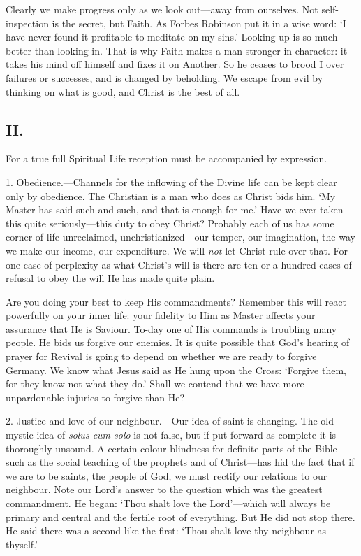 \documentclass[12pt,a5paper]{article}
\begin{document}
Clearly we make progress only as we look out---away from ourselves. Not self-inspection is the secret, but Faith. As Forbes Robinson put it in a wise word: `I have never found it profitable to meditate on my sins.' Looking up is so much better than looking in. That is why Faith makes a man stronger in character: it takes his mind off himself and fixes it on Another. So he ceases to brood I over failures or successes, and is changed by beholding. We escape from evil by thinking on what is good, and Christ is the best of all.

\subsection*{II.}

For a true full Spiritual Life reception must be accompanied by expression. 

1. Obedience.---Channels for the inflowing of the Divine life can be kept clear only by obedience. The Christian is a man who does as Christ bids him. `My Master has said such and such, and that is enough for me.' Have we ever taken this quite seriously---this duty to obey Christ? Probably each of us has some corner of life unreclaimed, unchristianized---our temper, our imagination, the way we make our income, our expenditure. We will \textit{not} let Christ rule over that. For one case of perplexity as what Christ's will is there are ten or a hundred cases of refusal to obey the will He has made quite plain.

Are you doing your best to keep His commandments? Remember this will react powerfully on your inner life: your fidelity to Him as Master affects your assurance that He is Saviour. To-day one of His commands is troubling many people. He bids us forgive our enemies. It is quite possible that God's hearing of prayer for Revival is going to depend on whether we are ready to forgive Germany. We know what Jesus said as He hung upon the Cross: `Forgive them, for they know not what they do.' Shall we contend that we have more unpardonable injuries to forgive than He?

2. Justice and love of our neighbour.---Our idea of saint is changing. The old mystic idea of \textit{solus cum solo} is not false, but if put forward as complete it is thoroughly unsound. A certain colour-blindness for definite parts of the Bible---such as the social teaching of the prophets and of Christ---has hid the fact that if we are to be saints, the people of God, we must rectify our relations to our neighbour. Note our Lord's answer to the question which was the greatest commandment. He began: `Thou shalt love the Lord'---which will always be primary and central and the fertile root of everything. But He did not stop there. He said there was a second like the first: `Thou shalt love thy neighbour as thyself.'
\end{document}
